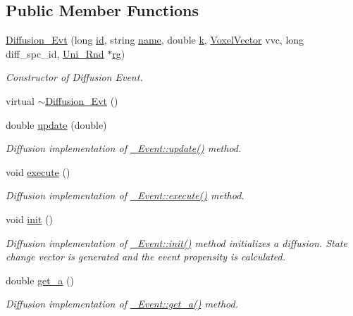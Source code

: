 \subsection*{Public Member Functions}
\begin{DoxyCompactItemize}
\item 
\hyperlink{classnw_1_1_diffusion___evt_aa7a2892e0b8c19e58df2a37ab71213cc}{Diffusion\+\_\+\+Evt} (long \hyperlink{classnw_1_1___event_a8f7ce287f596266dd763ec7db2f74090}{id}, string \hyperlink{classnw_1_1___event_ab4f50a54039cd4957bdca55049178562}{name}, double \hyperlink{classnw_1_1___event_afca0ae816e9834add07db8e9a6618faa}{k}, \hyperlink{namespacenw_ad7146b8b5a9de9be416847f41135722c}{Voxel\+Vector} vvc, long diff\+\_\+spc\+\_\+id, \hyperlink{classnw_1_1_uni___rnd}{Uni\+\_\+\+Rnd} $\ast$\hyperlink{classnw_1_1___event_af92482aeea55562560573ecccd5ab108}{rg})
\begin{DoxyCompactList}\small\item\em Constructor of Diffusion Event. \end{DoxyCompactList}\item 
virtual \hyperlink{classnw_1_1_diffusion___evt_a13608fc5a0cbe6e77caeca4cd77def61}{$\sim$\+Diffusion\+\_\+\+Evt} ()
\item 
double \hyperlink{classnw_1_1_diffusion___evt_a35841daf14d9ba472c0ed1f414187097}{update} (double)
\begin{DoxyCompactList}\small\item\em Diffusion implementation of \hyperlink{classnw_1_1___event_a882115f8652c881bc8ed43f1050ccba3}{\+\_\+\+Event\+::update()} method. \end{DoxyCompactList}\item 
void \hyperlink{classnw_1_1_diffusion___evt_a5cd6413241bd01ecb6a58fc0359ab57b}{execute} ()
\begin{DoxyCompactList}\small\item\em Diffusion implementation of \hyperlink{classnw_1_1___event_aa022418fb765582a053ac75cbc3436d6}{\+\_\+\+Event\+::execute()} method. \end{DoxyCompactList}\item 
void \hyperlink{classnw_1_1_diffusion___evt_adaaca9b5b7e6902189dfc79d8d5a4f99}{init} ()
\begin{DoxyCompactList}\small\item\em Diffusion implementation of \hyperlink{classnw_1_1___event_ae2c608ee2508058d6f318ca2ca8f4317}{\+\_\+\+Event\+::init()} method initializes a diffusion. State change vector is generated and the event propensity is calculated. \end{DoxyCompactList}\item 
double \hyperlink{classnw_1_1_diffusion___evt_a468711cd0c37b2129898cb8e79c2f085}{get\+\_\+a} ()
\begin{DoxyCompactList}\small\item\em Diffusion implementation of \hyperlink{classnw_1_1___event_a75945699f539cefab36eb6693a389918}{\+\_\+\+Event\+::get\+\_\+a()} method. \end{DoxyCompactList}\end{DoxyCompactItemize}

